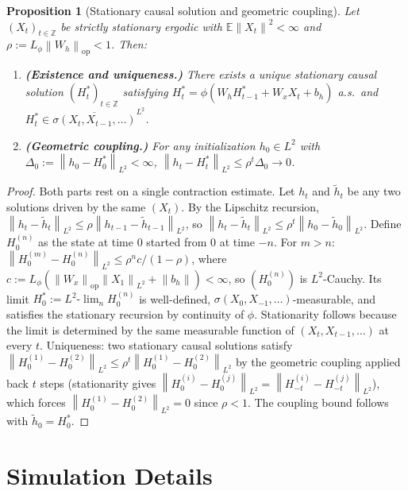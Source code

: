 \documentclass[bj,authoryear]{imsart}
\theoremstyle{plain}
\newtheorem{proposition}[theorem]{Proposition}
\theoremstyle{definition}
\newcommand{\E}{\mathbb{E}}
\newcommand{\Z}{\mathbb{Z}}
\newcommand{\norm}[1]{\left\lVert #1 \right\rVert}
\begin{document}
\begin{proposition}[Stationary causal solution and geometric coupling]
\label{prop:stationary-causal}
  Let $(X_t)_{t\in\Z}$ be strictly stationary ergodic with
  $\E\norm{X_t}^2<\infty$ and $\rho:=L_\phi\norm{W_h}_{\mathrm{op}}<1$.
  Then:
  \begin{enumerate}[label=(\roman*)]
    \item \textbf{(Existence and uniqueness.)}
      There exists a unique stationary causal solution $(H_t^*)_{t\in\Z}$
      satisfying $H_t^*=\phi(W_hH_{t-1}^*+W_xX_t+b_h)$ a.s.\ and
      $H_t^*\in\overline{\sigma(X_t,X_{t-1},\ldots)}^{L^2}$.
    \item \textbf{(Geometric coupling.)}
      For any initialization $h_0\in L^2$ with
      $\Delta_0:=\norm{h_0-H_0^*}_{L^2}<\infty$,
      $\norm{h_t-H_t^*}_{L^2}\leq\rho^t\Delta_0 \to 0$.
  \end{enumerate}
\end{proposition}

\begin{proof}
  Both parts rest on a single contraction estimate.
  Let $h_t$ and $\tilde h_t$ be any two solutions driven by the same $(X_t)$.
  By the Lipschitz recursion,
  $\norm{h_t-\tilde h_t}_{L^2}\leq\rho\norm{h_{t-1}-\tilde h_{t-1}}_{L^2}$,
  so $\norm{h_t-\tilde h_t}_{L^2}\leq\rho^t\norm{h_0-\tilde h_0}_{L^2}$.
  Define $H_0^{(n)}$ as the state at time 0 started from $0$ at time $-n$.
  For $m>n$: $\norm{H_0^{(m)}-H_0^{(n)}}_{L^2}\leq\rho^n c/(1-\rho)$,
  where $c:=L_\phi(\norm{W_x}_{\mathrm{op}}\norm{X_1}_{L^2}+\norm{b_h})<\infty$,
  so $(H_0^{(n)})$ is $L^2$-Cauchy.
  Its limit $H_0^*:=L^2\text{-}\lim_n H_0^{(n)}$ is well-defined,
  $\sigma(X_0,X_{-1},\ldots)$-measurable, and satisfies the stationary
  recursion by continuity of $\phi$.  Stationarity follows because the limit
  is determined by the same measurable function of $(X_t,X_{t-1},\ldots)$
  at every $t$.
  Uniqueness: two stationary causal solutions satisfy
  $\norm{H_0^{(1)}-H_0^{(2)}}_{L^2}
  \leq\rho^t\norm{H_0^{(1)}-H_0^{(2)}}_{L^2}$
  by the geometric coupling applied back $t$ steps (stationarity gives
  $\norm{H_0^{(i)}-H_0^{(j)}}_{L^2}=\norm{H_{-t}^{(i)}-H_{-t}^{(j)}}_{L^2}$),
  which forces $\norm{H_0^{(1)}-H_0^{(2)}}_{L^2}=0$ since $\rho<1$.
  The coupling bound follows with $\tilde h_0=H_0^*$.
\end{proof}

\section{Simulation Details}
\label{app:sims}
\end{document}
